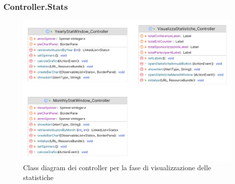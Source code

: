 \subsubsection{Controller.Stats}
\begin{figure}[h!]
	\includegraphics[scale=0.2]{Immagini/Controller_Statistiche.png}
	\caption{Class diagram dei controller per la fase di visualizzazione delle statistiche}
\end{figure}
\newpage
